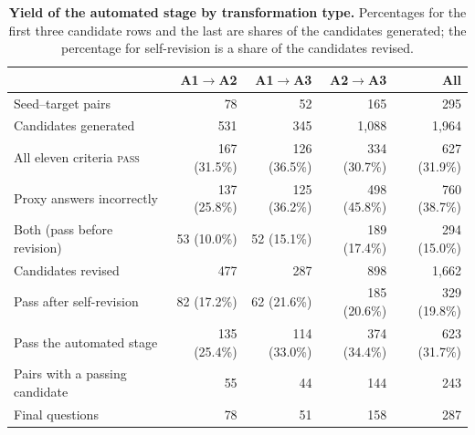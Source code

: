 \begin{table}[t]
\centering
\small
\caption{\textbf{Yield of the automated stage by transformation type.}
Percentages for the first three candidate rows and the last are shares of the candidates generated; the percentage for self-revision is a share of the candidates revised.}
\label{tab:yield_by_type}
\begin{tabular*}{\textwidth}{@{\extracolsep{\fill}}lrrrr@{}}
\toprule
 & \textbf{A1$\rightarrow$A2} & \textbf{A1$\rightarrow$A3} & \textbf{A2$\rightarrow$A3} & \textbf{All} \\
\midrule
Seed--target pairs                  & 78           & 52           & 165          & 295          \\
Candidates generated                & 531          & 345          & 1,088        & 1,964        \\
\quad All eleven criteria \textsc{pass} & 167 (31.5\%) & 126 (36.5\%) & 334 (30.7\%) & 627 (31.9\%) \\
\quad Proxy answers incorrectly     & 137 (25.8\%) & 125 (36.2\%) & 498 (45.8\%) & 760 (38.7\%) \\
\quad Both (pass before revision)   & 53 (10.0\%)  & 52 (15.1\%)  & 189 (17.4\%) & 294 (15.0\%) \\
\midrule
Candidates revised                  & 477          & 287          & 898          & 1,662        \\
\quad Pass after self-revision      & 82 (17.2\%)  & 62 (21.6\%)  & 185 (20.6\%) & 329 (19.8\%) \\
\midrule
Pass the automated stage            & 135 (25.4\%) & 114 (33.0\%) & 374 (34.4\%) & 623 (31.7\%) \\
Pairs with a passing candidate      & 55           & 44           & 144          & 243          \\
\midrule
Final questions                     & 78           & 51           & 158          & 287          \\
\bottomrule
\end{tabular*}
\end{table}